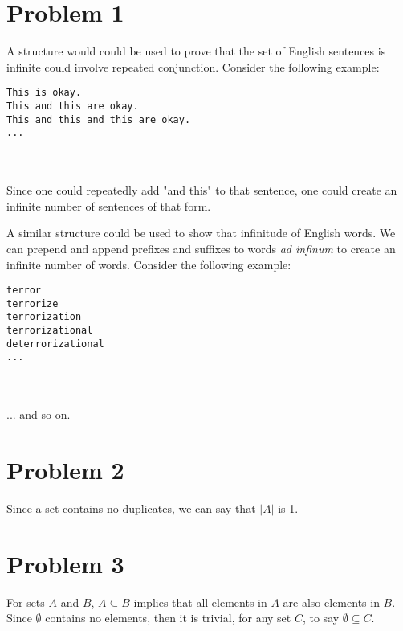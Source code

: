 \documentclass{article}%
\begin{document}
\section*{Problem 1}

A structure would could be used to prove that the set of English sentences is infinite could involve repeated conjunction. Consider the following example:
\lstset{language=Bash}
\begin{lstlisting}[frame=single]
This is okay.
This and this are okay.
This and this and this are okay.
...
\end{lstlisting}\\
\\
Since one could repeatedly add "and this" to that sentence, one could create an infinite number of sentences of that form.

\vspace{10mm}

\noindent A similar structure could be used to show that infinitude of English words. We can prepend and append prefixes and suffixes to words
\textit{ad infinum} to create an infinite number of words. Consider the following example:
\begin{lstlisting}[frame=single]
terror
terrorize
terrorization
terrorizational
deterrorizational
...
\end{lstlisting}\\
\\
... and so on.

\section*{Problem 2}

Since a set contains no duplicates, we can say that $| A |$ is 1.

\section*{Problem 3}

For sets $A$ and $B$, $A \subseteq B$ implies that all elements in $A$ are also elements in $B$. Since $\emptyset$ contains no elements,
then it is trivial, for any set $C$, to say $\emptyset \subseteq C$.
\end{document}
